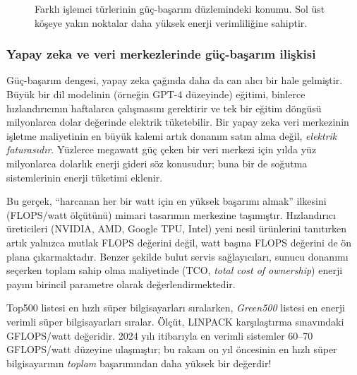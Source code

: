 \begin{figure}[H]
\caption[Farklı işlemci türlerinin güç-başarım düzlemindeki konumu]{Farklı işlemci türlerinin güç-başarım düzlemindeki konumu. Sol üst köşeye yakın noktalar daha yüksek enerji verimliliğine sahiptir.}
\label{fig:guc-basarim-dagilim}
\end{figure}

\subsubsection*{Yapay zeka ve veri merkezlerinde güç-başarım ilişkisi}
Güç-başarım dengesi, yapay zeka çağında daha da can alıcı bir hale gelmiştir. Büyük bir dil modelinin (örneğin GPT-4 düzeyinde) eğitimi, binlerce hızlandırıcının haftalarca çalışmasını gerektirir ve tek bir eğitim döngüsü milyonlarca dolar değerinde elektrik tüketebilir. Bir yapay zeka veri merkezinin işletme maliyetinin en büyük kalemi artık donanım satın alma değil, \emph{elektrik faturasıdır}. Yüzlerce megawatt güç çeken bir veri merkezi için yılda yüz milyonlarca dolarlık enerji gideri söz konusudur; buna bir de soğutma sistemlerinin enerji tüketimi eklenir.

Bu gerçek, ``harcanan her bir watt için en yüksek başarımı almak'' ilkesini (FLOPS/watt ölçütünü) mimari tasarımın merkezine taşımıştır. Hızlandırıcı üreticileri (NVIDIA, AMD, Google TPU, Intel) yeni nesil ürünlerini tanıtırken artık yalnızca mutlak FLOPS değerini değil, watt başına FLOPS değerini de ön plana çıkarmaktadır. Benzer şekilde bulut servis sağlayıcıları, sunucu donanımı seçerken toplam sahip olma maliyetinde (TCO, \emph{total cost of ownership}) enerji payını birincil parametre olarak değerlendirmektedir.

\begin{bilginot}
Top500 listesi en hızlı süper bilgisayarları sıralarken, \emph{Green500} listesi en enerji verimli süper bilgisayarları sıralar. Ölçüt, LINPACK karşılaştırma sınavındaki GFLOPS/watt değeridir. 2024 yılı itibarıyla en verimli sistemler 60--70 GFLOPS/watt düzeyine ulaşmıştır; bu rakam on yıl öncesinin en hızlı süper bilgisayarının \emph{toplam} başarımından daha yüksek bir değerdir!
\end{bilginot}


